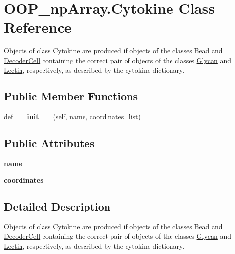 \hypertarget{class_o_o_p__np_array_1_1_cytokine}{}\section{O\+O\+P\+\_\+np\+Array.\+Cytokine Class Reference}
\label{class_o_o_p__np_array_1_1_cytokine}


Objects of class \mbox{\hyperlink{class_o_o_p__np_array_1_1_cytokine}{Cytokine}} are produced if objects of the classes \mbox{\hyperlink{class_o_o_p__np_array_1_1_bead}{Bead}} and \mbox{\hyperlink{class_o_o_p__np_array_1_1_decoder_cell}{Decoder\+Cell}} containing the correct pair of objects of the classes \mbox{\hyperlink{class_o_o_p__np_array_1_1_glycan}{Glycan}} and \mbox{\hyperlink{class_o_o_p__np_array_1_1_lectin}{Lectin}}, respectively, as described by the cytokine dictionary.  


\subsection*{Public Member Functions}
\begin{DoxyCompactItemize}
\item 
\mbox{\label{class_o_o_p__np_array_1_1_cytokine_a04d9ec5c36f2085a96d1739f6704e61a}} 
def {\bfseries \+\_\+\+\_\+init\+\_\+\+\_\+} (self, name, coordinates\+\_\+list)
\end{DoxyCompactItemize}
\subsection*{Public Attributes}
\begin{DoxyCompactItemize}
\item 
\mbox{\label{class_o_o_p__np_array_1_1_cytokine_a9fffcc73b298397c3e3f875271150366}} 
{\bfseries name}
\item 
\mbox{\label{class_o_o_p__np_array_1_1_cytokine_a7572997cfcaa00addf94e0746fd1e4b1}} 
{\bfseries coordinates}
\end{DoxyCompactItemize}


\subsection{Detailed Description}
Objects of class \mbox{\hyperlink{class_o_o_p__np_array_1_1_cytokine}{Cytokine}} are produced if objects of the classes \mbox{\hyperlink{class_o_o_p__np_array_1_1_bead}{Bead}} and \mbox{\hyperlink{class_o_o_p__np_array_1_1_decoder_cell}{Decoder\+Cell}} containing the correct pair of objects of the classes \mbox{\hyperlink{class_o_o_p__np_array_1_1_glycan}{Glycan}} and \mbox{\hyperlink{class_o_o_p__np_array_1_1_lectin}{Lectin}}, respectively, as described by the cytokine dictionary. 


